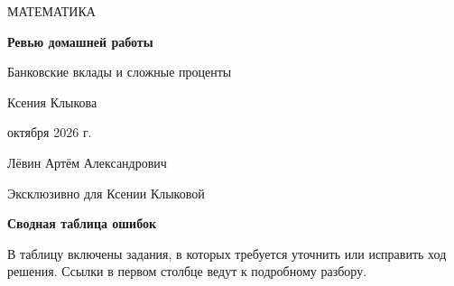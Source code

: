 \documentclass[a4paper,11pt]{article}
\begin{document}
\thispagestyle{empty}
\vspace*{36mm}
\begin{center}
{\fontsize{13}{18}\selectfont\color{muted}МАТЕМАТИКА}\par\vspace{19mm}
{\fontsize{31}{38}\selectfont\bfseries\color{deep}Ревью домашней работы}\par\vspace{9mm}
{\fontsize{17}{23}\selectfont Банковские вклады и сложные проценты}\par
\vspace{28mm}
{\fontsize{17}{23}\selectfont Ксения Клыкова}\par
\vspace{11mm}
{\fontsize{13}{20} октября 2026 г.}\par
\vfill
{\fontsize{12}{19}\selectfont Лёвин Артём Александрович}\par
{\fontsize{11}{17}\selectfont\color{muted}Эксклюзивно для Ксении Клыковой}\par\vspace{11mm}
\end{center}
\newpage
\begin{center}
{\LARGE\bfseries\color{deep}Сводная таблица ошибок}
\end{center}
\vspace{8mm}
В таблицу включены задания, в которых требуется уточнить или исправить ход решения. Ссылки в первом столбце ведут к подробному разбору.
\end{document}
